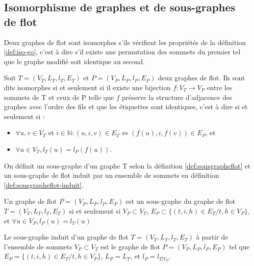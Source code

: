 \subsection{Isomorphisme de graphes et de sous-graphes de flot}
Deux graphes de flot sont isomorphes s'ils vérifient les
propriétés de la définition \ref{def:iso-go}, c'est à dire s'il existe une permutation des sommets du premier tel que le graphe modifié soit identique au second.

\begin{defi}\label{def:iso-go}
Soit $T=(V_T, L_T, l_T, E_T)$ et $P=(V_P, L_P, l_P, E_P)$ deux graphes de flot. Ils sont dits isomorphes si et seulement si il existe une bijection $f:V_T\rightarrow V_P$ entre les sommets de T et ceux de P telle que $f$ préserve la structure d'adjacence des graphes avec l'ordre des fils et que les étiquettes sont identiques, c'est à dire si et seulement si :
\begin{itemize}
 \item $\forall u, v \in V_T$ et $i\in\mathbb{N} : (u, i, v) \in E_T \Leftrightarrow (f(u), i, f(v)) \in E_P$, et
 \item $\forall u\in V_T, l_T(u)=l_P(f(u))$.
\end{itemize}
\end{defi}

On définit un sous-graphe d'un graphe T selon la définition \ref{def:sousgrapheflot} et un sous-graphe de flot induit par un ensemble de sommets en définition \ref{def:sousgrapheflot-induit}.

\begin{defi}\label{def:sousgrapheflot}
Un graphe de flot $P=(V_P, L_P, l_P, E_P)$ est un sous-graphe du graphe de flot $T=(V_T, L_T, l_T, E_T)$ si et seulement si $V_P \subset V_T$, $E_P\subset\{(t, i, h)\in E_T / t, h \in V_P \}$, et $\forall u\in V_P, l_P(u)=l_T(u)$
\end{defi}

\begin{defi}\label{def:sousgrapheflot-induit}
Le sous-graphe induit d'un graphe de flot $T=(V_T, L_T, l_T, E_T)$ à partir de l'ensemble de sommets $V_P \subset V_T$ est le graphe de flot $P=(V_P, L_P, l_P, E_P)$ tel que $E_P=\{(t, i, h)\in E_T / t, h \in V_P \}$, $L_P=L_T$, et $l_P=l_{T\vert V_P}$.
\end{defi}

% 



